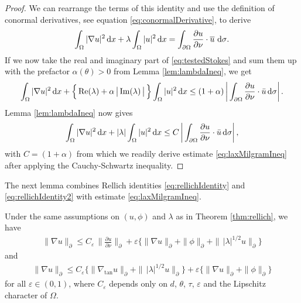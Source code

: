 \begin{proof}
  We can rearrange the terms of this identity and use the definition of conormal derivatives, see equation \eqref{eq:conormalDerivative}, to derive
  \begin{align}
    \label{eq:testedStokes}
    \int_\Omega |\nabla u|^2 \, {\operatorname{d}\!{x}} + \lambda \int_\Omega |u|^2 \, {\operatorname{d}\!{x}} = \int_{\partial\Omega} \frac{\partial u}{\partial \nu} \cdot \overline u \, \, {\operatorname{d}\!{\sigma}}.
  \end{align}
  If we now take the real and imaginary part of \eqref{eq:testedStokes} and sum them up with the prefactor $\alpha(\theta) > 0$ from Lemma \ref{lem:lambdaIneq}, we get
  \begin{align*}
    \int_\Omega |\nabla u|^2 \, {\operatorname{d}\!{x}} + \Big\{ \operatorname{Re}(\lambda) + \alpha\, \big|\operatorname{Im}(\lambda)\,\big|\, \Big\} \int_\Omega |u|^2 \, {\operatorname{d}\!{x}}
    \leq (1 + \alpha) \, \bigg| \int_{\partial\Omega} \frac{\partial u}{\partial \nu} \cdot \bar u \, {\operatorname{d}\!{\sigma}} \bigg|\,.
  \end{align*}
  Lemma \ref{lem:lambdaIneq} now gives
  \begin{align*}
    \int_\Omega |\nabla u|^2 \, {\operatorname{d}\!{x}} + |\lambda| \int_\Omega |u|^2 \, {\operatorname{d}\!{x}} \leq C\,  \bigg| \int_{\partial\Omega} \frac{\partial u}{\partial \nu} \cdot \bar u \, {\operatorname{d}\!{\sigma}} \bigg|\,,
  \end{align*}
  with $C = (1 + \alpha)$ from which we readily derive estimate \eqref{eq:laxMilgramIneq} after applying the Cauchy-Schwartz inequality.
\end{proof}

The next lemma combines Rellich identities \eqref{eq:rellichIdentity} and \eqref{eq:rellichIdentity2} with estimate \eqref{eq:laxMilgramIneq}.

\begin{lem}
  Under the same assumptions on $(u,\phi)$ and $\lambda$ as in Theorem \ref{thm:rellich}, we have
  \begin{align}
    \label{eq:gradEstimateRellich}
    \| \nabla u\|_\partial \leq C_\varepsilon \,\Big\| \frac{\partial u}{\partial \nu} \Big\|_\partial + \varepsilon \Big\{ \|\nabla u\|_\partial + \|\phi\|_\partial + \| \, |\lambda|^{1/2} u\|_\partial \Big\}
  \end{align}
  and
  \begin{align}
    \label{eq:gradEstimateRellich2}
    \|\nabla u\|_\partial \leq C_\varepsilon \Big\{ \|\nabla_{\mathrm{tan}} u \|_\partial + \|\, |\lambda|^{1/2} u\|_\partial \Big\} + \varepsilon \{ \|\nabla u\|_\partial + \|\phi\|_\partial \}
  \end{align}
  for all $\varepsilon \in (0,1)$, where $C_\varepsilon$ depends only on $d$, $\theta$, $\tau$, $\varepsilon$ and the Lipschitz character of $\Omega$.
\end{lem}

